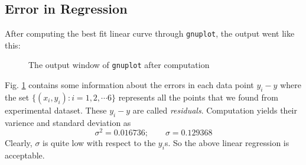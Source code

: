 \documentclass[11pt]{scrartcl}
\begin{document}
\subsection{Error in Regression}
After computing the best fit linear curve through \texttt{gnuplot}, the output went like this:
\begin{figure}[h]
    \centering
    \caption{The output window of \texttt{gnuplot} after computation}
    \label{fig:gnuplot}
\end{figure}

\newpage

Fig. \ref{fig:gnuplot} contains some information about the errors in each data point \(y_i - y\) where the set \(\{(x_i, y_i) : i = 1, 2, \cdots 6\}\) represents all the points that we found from experimental dataset. These \(y_i - y\) are called \emph{residuals}. Computation yields their varience and standard deviation as 
\begin{equation}
    \boxed{\sigma^2 = 0.016736; \qquad \sigma = 0.129368}
\end{equation}
Clearly, \(\sigma\) is quite low with respect to the \(y_i\)s. So the above linear regression is acceptable.
\end{document}
